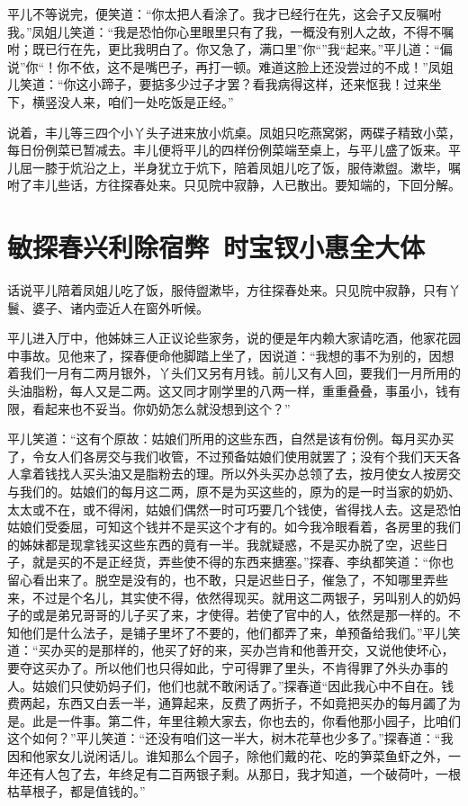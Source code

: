 \documentclass[12pt,oneside]{book}
\begin{document}
平儿不等说完，便笑道：“你太把人看涂了。我才已经行在先，这会子又反嘱咐我。”凤姐儿笑道：“我是恐怕你心里眼里只有了我，一概没有别人之故，不得不嘱咐；既已行在先，更比我明白了。你又急了，满口里”你“”我“起来。”平儿道：“偏说”你“！你不依，这不是嘴巴子，再打一顿。难道这脸上还没尝过的不成！”凤姐儿笑道：“你这小蹄子，要掂多少过子才罢？看我病得这样，还来怄我！过来坐下，横竖没人来，咱们一处吃饭是正经。”

说着，丰儿等三四个小丫头子进来放小炕桌。凤姐只吃燕窝粥，两碟子精致小菜，每日份例菜已暂减去。丰儿便将平儿的四样份例菜端至桌上，与平儿盛了饭来。平儿屈一膝于炕沿之上，半身犹立于炕下，陪着凤姐儿吃了饭，服侍漱盥。漱毕，嘱咐了丰儿些话，方往探春处来。只见院中寂静，人已散出。要知端的，下回分解。
 
 
\chapter{敏探春兴利除宿弊~时宝钗小惠全大体}
话说平儿陪着凤姐儿吃了饭，服侍盥漱毕，方往探春处来。只见院中寂静，只有丫鬟、婆子、诸内壶近人在窗外听候。

平儿进入厅中，他姊妹三人正议论些家务，说的便是年内赖大家请吃酒，他家花园中事故。见他来了，探春便命他脚踏上坐了，因说道：“我想的事不为别的，因想着我们一月有二两月银外，丫头们又另有月钱。前儿又有人回，要我们一月所用的头油脂粉，每人又是二两。这又同才刚学里的八两一样，重重叠叠，事虽小，钱有限，看起来也不妥当。你奶奶怎么就没想到这个？”

平儿笑道：“这有个原故：姑娘们所用的这些东西，自然是该有份例。每月买办买了，令女人们各房交与我们收管，不过预备姑娘们使用就罢了；没有个我们天天各人拿着钱找人买头油又是脂粉去的理。所以外头买办总领了去，按月使女人按房交与我们的。姑娘们的每月这二两，原不是为买这些的，原为的是一时当家的奶奶、太太或不在，或不得闲，姑娘们偶然一时可巧要几个钱使，省得找人去。这是恐怕姑娘们受委屈，可知这个钱并不是买这个才有的。如今我冷眼看着，各房里的我们的姊妹都是现拿钱买这些东西的竟有一半。我就疑惑，不是买办脱了空，迟些日子，就是买的不是正经货，弄些使不得的东西来搪塞。”探春、李纨都笑道：“你也留心看出来了。脱空是没有的，也不敢，只是迟些日子，催急了，不知哪里弄些来，不过是个名儿，其实使不得，依然得现买。就用这二两银子，另叫别人的奶妈子的或是弟兄哥哥的儿子买了来，才使得。若使了官中的人，依然是那一样的。不知他们是什么法子，是铺子里坏了不要的，他们都弄了来，单预备给我们。”平儿笑道：“买办买的是那样的，他买了好的来，买办岂肯和他善开交，又说他使坏心，要夺这买办了。所以他们也只得如此，宁可得罪了里头，不肯得罪了外头办事的人。姑娘们只使奶妈子们，他们也就不敢闲话了。”探春道“因此我心中不自在。钱费两起，东西又白丢一半，通算起来，反费了两折子，不如竟把买办的每月蠲了为是。此是一件事。第二件，年里往赖大家去，你也去的，你看他那小园子，比咱们这个如何？”平儿笑道：“还没有咱们这一半大，树木花草也少多了。”探春道：“我因和他家女儿说闲话儿。谁知那么个园子，除他们戴的花、吃的笋菜鱼虾之外，一年还有人包了去，年终足有二百两银子剩。从那日，我才知道，一个破荷叶，一根枯草根子，都是值钱的。”
\end{document}
